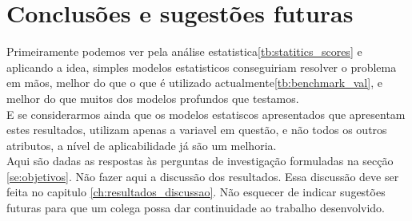 \chapter{Conclusões e sugestões futuras}

Primeiramente podemos ver pela análise estatistica\ref{tb:statitics_scores} e aplicando a idea\cite{Elsayed}, simples modelos estatisticos conseguiriam resolver o problema em mãos, melhor do que o que é utilizado actualmente\ref{tb:benchmark_val}, e melhor do que muitos dos modelos profundos que testamos. \\
E se considerarmos ainda que os modelos estatiscos apresentados que apresentam estes resultados, utilizam apenas a variavel em questão, e não todos os outros atributos, a nível de aplicabilidade já são um melhoria. \\




Aqui são dadas as respostas às perguntas de investigação formuladas na secção \ref{se:objetivos}. Não fazer aqui a discussão dos resultados. Essa discussão deve ser feita no capitulo \ref{ch:resultados_discussao}. Não esquecer de indicar sugestões futuras para que um colega possa dar continuidade ao trabalho desenvolvido. 